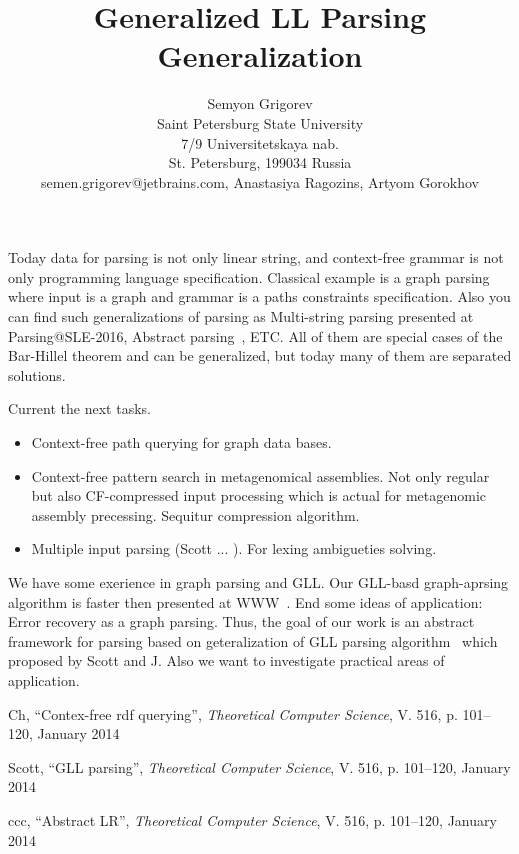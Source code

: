 \documentclass[12pt]{article}  %
\title{Generalized LL Parsing Generalization}
\author{Semyon Grigorev
\\
       {Saint Petersburg State University}\\
       {7/9 Universitetskaya nab.}\\
       {St. Petersburg, 199034 Russia}\\
       {semen.grigorev@jetbrains.com}, 
       Anastasiya Ragozins, Artyom Gorokhov}
\theoremstyle{definition}
\theoremstyle{remark}
\begin{document}
\maketitle

Today data for parsing is not only linear string, and context-free grammar is not only programming language specification.
Classical example is a graph parsing where input is a graph and grammar is a paths constraints specification.
Also you can find such generalizations of parsing as Multi-string parsing presented at Parsing@SLE-2016, Abstract parsing~\cite{AbstractParsing}, ETC.
All of them are special cases of the Bar-Hillel theorem and can be generalized, but today many of them are separated solutions.

 Current the next tasks.
\begin{itemize}
\item Context-free path querying for graph data bases. 
\item Context-free pattern search in metagenomical assemblies. Not only regular but also CF-compressed input processing which is actual for metagenomic assembly precessing. 
Sequitur compression algorithm.
\item Multiple input parsing (Scott ... ). For lexing ambigueties solving.
\end{itemize}

We have some exerience in graph parsing and GLL. Our GLL-basd graph-aprsing algorithm is faster 
then presented at WWW~\cite{CFRDFParsing}.  End some ideas of application: Error recovery as a 
graph parsing. 
Thus, the goal of our work is an abstract framework for parsing based on geteralization of GLL parsing 
algorithm~\cite{GLL} which proposed by Scott and J.  Also we want to investigate practical areas of 
application.

\begin{thebibliography}{9}

  Ch,
  ``Contex-free rdf querying'',
  \emph{Theoretical Computer Science},
  V. 516,
  p. 101--120,
  January 2014

  Scott,
  ``GLL parsing'',
  \emph{Theoretical Computer Science},
  V. 516,
  p. 101--120,
  January 2014

  ccc,
  ``Abstract LR'',
  \emph{Theoretical Computer Science},
  V. 516,
  p. 101--120,
  January 2014

\end{thebibliography}
\end{document}
